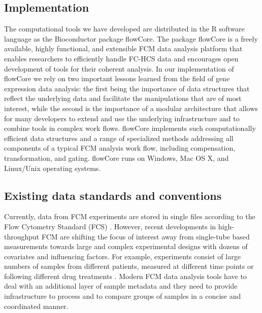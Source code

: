 \documentclass[10pt]{bmc_article}
\newcommand{\Rpackage}[1]{{\textsf{#1}}}
\newenvironment{bmcformat}{\begin{raggedright}\baselineskip20pt\sloppy\setboolean{publ}{false}}{\end{raggedright}\baselineskip20pt\sloppy}
\begin{document}
\begin{bmcformat}
\section*{Implementation}
The computational tools we have developed are distributed in the R
software language \cite{Rmain} as the Bioconductor \cite{BIOC} package
\Rpackage{flowCore}.  The package \Rpackage{flowCore} is a freely
available, highly functional, and extensible FCM data analysis
platform that enables researchers to efficiently handle FC-HCS data
and encourages open development of tools for their coherent
analysis. In our implementation of \Rpackage{flowCore} we rely on two
important lessons learned from the field of gene expression data
analysis: the first being the importance of data structures that
reflect the underlying data and facilitate the manipulations that are
of most interest, while the second is the importance of a modular
architecture that allows for many developers to extend and use the
underlying infrastructure and to combine tools in complex work flows.
\Rpackage{flowCore} implements such computationally efficient data
structures and a range of specialized methods addressing all
components of a typical FCM analysis work flow, including
compensation, transformation, and gating. \Rpackage{flowCore} runs on
Windows, Mac OS X, and Linux/Unix operating systems. 

\subsection*{Existing data standards and conventions}
Currently, data from FCM experiments are stored in single files
according to the Flow Cytometry Standard (FCS) \cite{seamer1997pnd}.
However, recent developments in high-throughput FCM are shifting the
focus of interest away from single-tube based measurements towards
large and complex experimental designs with dozens of covariates and
influencing factors. For example, experiments consist of large numbers
of samples from different patients, measured at different time points
\cite{brinkman2007hcf} or following different drug treatments
\cite{gasparetto2004ice}. Modern FCM data analysis tools have to deal
with an additional layer of sample metadata and they need to provide
infrastructure to process and to compare groups of samples in a
concise and coordinated manner.


\end{bmcformat}
\end{document}
